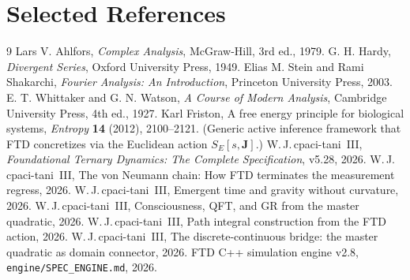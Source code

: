 \documentclass[11pt]{article}
\theoremstyle{tight}
\theoremstyle{plainroman}
\begin{document}
\section{Selected References}
\begin{thebibliography}{9}
Lars V. Ahlfors,
\emph{Complex Analysis},
McGraw-Hill, 3rd ed., 1979.
G. H. Hardy,
\emph{Divergent Series},
Oxford University Press, 1949.
Elias M. Stein and Rami Shakarchi,
\emph{Fourier Analysis: An Introduction},
Princeton University Press, 2003.
E. T. Whittaker and G. N. Watson,
\emph{A Course of Modern Analysis},
Cambridge University Press, 4th ed., 1927.
Karl Friston,
A free energy principle for biological systems,
\emph{Entropy} \textbf{14} (2012), 2100--2121.
(Generic active inference framework that FTD concretizes via the Euclidean action $S_E[s,\mathbf J]$.)
W.\,J.\,cpaci-tani~III,
\emph{Foundational Ternary Dynamics: The Complete Specification}, v5.28, 2026.
W.\,J.\,cpaci-tani~III,
The von Neumann chain: How FTD terminates the measurement regress, 2026.
W.\,J.\,cpaci-tani~III,
Emergent time and gravity without curvature, 2026.
W.\,J.\,cpaci-tani~III,
Consciousness, QFT, and GR from the master quadratic, 2026.
W.\,J.\,cpaci-tani~III,
Path integral construction from the FTD action, 2026.
W.\,J.\,cpaci-tani~III,
The discrete-continuous bridge: the master quadratic as domain connector, 2026.
FTD C++ simulation engine v2.8, \texttt{engine/SPEC\_ENGINE.md}, 2026.
\end{thebibliography}
\end{document}
